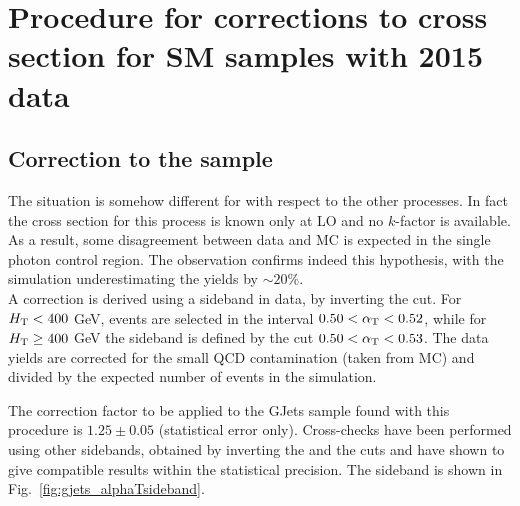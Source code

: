 \section{Procedure for corrections to cross section for SM samples with 2015 data}
\label{app:sideband-corrections-old}

\subsection{Correction to the \gj sample}
\label{sec:sideband_corrections_gjets}
The situation is somehow different for \gj with respect to the other processes. 
In fact the cross section for this process is known only at LO and no $k$-factor is available. 
As a result, some disagreement between data and MC is expected in the single photon control region.
The observation confirms indeed this hypothesis, with the simulation underestimating the yields by $\sim 20\%$. \\
A correction is derived using a sideband in data, by inverting the \alphat cut. 
For $\mbox{$H_\text{T}$} < 400$ GeV, events are selected in the interval $0.50 < \alpha_{\text{T}} < 0.52$, 
while for $\mbox{$H_\text{T}$} \geq 400$ GeV the sideband is defined by the cut $0.50 < \alpha_{\text{T}} < 0.53$.
The data yields are corrected for the small QCD contamination (taken from MC) and divided by the expected number of events in the simulation. 

The correction factor to be applied to the GJets sample found with this procedure is $1.25 \pm 0.05$ (statistical error only). 
Cross-checks have been performed using other sidebands, obtained by inverting the \scalht and the \mhtmet cuts 
and have shown to give compatible results within the statistical precision. 
The sideband is shown in Fig.~\ref{fig:gjets_alphaTsideband}. 

